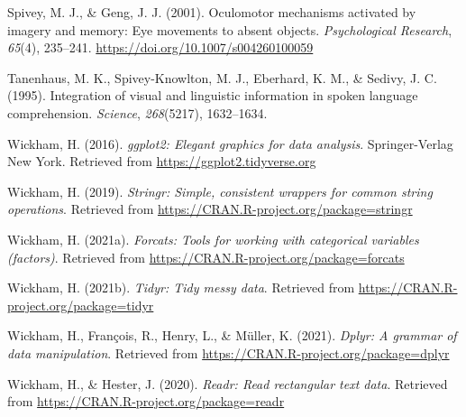 \documentclass[
  english,
  man,floatsintext]{apa6}
\newlength{\cslhangindent}
\newlength{\cslentryspacingunit} %
\newenvironment{CSLReferences}[2] %
 {%
  \setlength{\parindent}{0pt}
  \ifodd #1
  \let\oldpar\par
  \def\par{\hangindent=\cslhangindent\oldpar}
  \fi
  \setlength{\parskip}{#2\cslentryspacingunit}
 }%
 {}
\begin{document}
\begin{CSLReferences}{1}{0}
\leavevmode{}%
Spivey, M. J., \& Geng, J. J. (2001). Oculomotor mechanisms activated by imagery and memory: Eye movements to absent objects. \emph{Psychological Research}, \emph{65}(4), 235--241. \url{https://doi.org/10.1007/s004260100059}

\leavevmode{}%
Tanenhaus, M. K., Spivey-Knowlton, M. J., Eberhard, K. M., \& Sedivy, J. C. (1995). Integration of visual and linguistic information in spoken language comprehension. \emph{Science}, \emph{268}(5217), 1632--1634.

\leavevmode{}%
Wickham, H. (2016). \emph{ggplot2: Elegant graphics for data analysis}. Springer-Verlag New York. Retrieved from \url{https://ggplot2.tidyverse.org}

\leavevmode{}%
Wickham, H. (2019). \emph{Stringr: Simple, consistent wrappers for common string operations}. Retrieved from \url{https://CRAN.R-project.org/package=stringr}

\leavevmode{}%
Wickham, H. (2021a). \emph{Forcats: Tools for working with categorical variables (factors)}. Retrieved from \url{https://CRAN.R-project.org/package=forcats}

\leavevmode{}%
Wickham, H. (2021b). \emph{Tidyr: Tidy messy data}. Retrieved from \url{https://CRAN.R-project.org/package=tidyr}

\leavevmode{}%
Wickham, H., François, R., Henry, L., \& Müller, K. (2021). \emph{Dplyr: A grammar of data manipulation}. Retrieved from \url{https://CRAN.R-project.org/package=dplyr}

\leavevmode{}%
Wickham, H., \& Hester, J. (2020). \emph{Readr: Read rectangular text data}. Retrieved from \url{https://CRAN.R-project.org/package=readr}

\end{CSLReferences}

\endgroup
\end{document}
